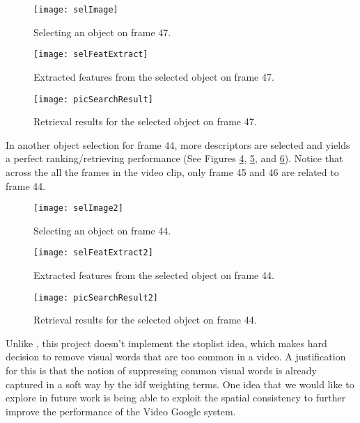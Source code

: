 \documentclass[conference]{IEEEtran}
\begin{document}
\begin{figure}[!t]
\centering
\texttt{[image: selImage]}
\caption{Selecting an object on frame 47.}
\label{fig:selImage}
\end{figure}

\begin{figure}[!t]
\centering
\texttt{[image: selFeatExtract]}
\caption{Extracted features from the selected object on frame 47.}
\label{fig:selFeatExtract}
\end{figure}

\begin{figure}[!t]
\centering
\texttt{[image: picSearchResult]}
\caption{Retrieval results for the selected object on frame 47.}
\label{fig:picSearchResult}
\end{figure}

In another object selection for frame 44, more descriptors are selected and yields a perfect ranking/retrieving performance (See Figures
\ref{fig:selImage}, \ref{fig:selFeatExtract}, and \ref{fig:picSearchResult}). 
Notice that across the
all the frames in the video clip, only frame 45 and 46 are related to frame 44.

\begin{figure}[!t]
\centering
\texttt{[image: selImage2]}
\caption{Selecting an object on frame 44.}
\label{fig:selImage}
\end{figure}

\begin{figure}[!t]
\centering
\texttt{[image: selFeatExtract2]}
\caption{Extracted features from the selected object on frame 44.}
\label{fig:selFeatExtract}
\end{figure}

\begin{figure}[!t]
\centering
\texttt{[image: picSearchResult2]}
\caption{Retrieval results for the selected object on frame 44.}
\label{fig:picSearchResult}
\end{figure}


Unlike \cite{sivic2003video}, this project doesn't implement the stoplist idea, which makes hard decision to remove visual words that are too common 
in a video. A justification for this is that the notion of suppressing common visual words is already captured in a soft way by the idf weighting terms.
One idea that we would like to explore in future work is being able to exploit the spatial consistency to further improve the performance of the Video
Google system.
\end{document}
